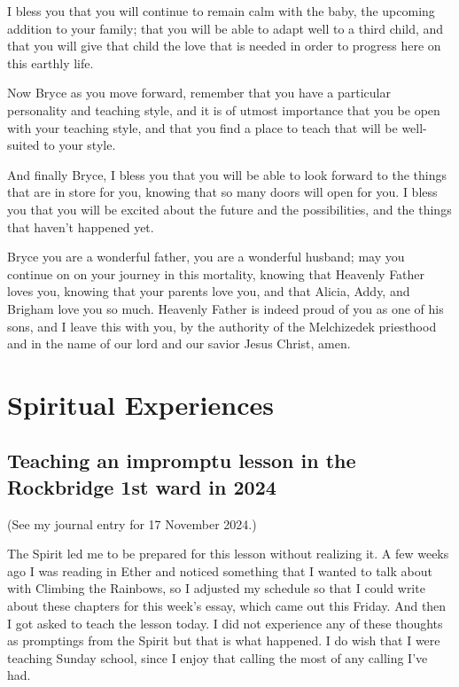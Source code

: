 			I bless you that you will continue to remain calm with the baby, the upcoming addition to your family; that you will be able to adapt well to a third child, and that you will give that child the love that is needed in order to progress here on this earthly life. 

			Now Bryce as you move forward, remember that you have a particular personality and teaching style, and it is of utmost importance that you be open with your teaching style, and that you find a place to teach that will be well-suited to your style. 

			And finally Bryce, I bless you that you will be able to look forward to the things that are in store for you, knowing that so many doors will open for you. I bless you that you will be excited about the future and the possibilities, and the things that haven't happened yet. 

			Bryce you are a wonderful father, you are a wonderful husband; may you continue on on your journey in this mortality, knowing that Heavenly Father loves you, knowing that your parents love you, and that Alicia, Addy, and Brigham love you so much. Heavenly Father is indeed proud of you as one of his sons, and I leave this with you, by the authority of the Melchizedek priesthood and in the name of our lord and our savior Jesus Christ, amen.

\section{Spiritual Experiences}
	\label{SE}
	
	\subsection{Teaching an impromptu lesson in the Rockbridge 1st ward in 2024}
		\label{SE-LESSON-CTR}
		
		(See my journal entry for 17 November 2024.)
		
		The Spirit led me to be prepared for this lesson without realizing it. A few weeks ago I was reading in Ether and noticed something that I wanted to talk about with Climbing the Rainbows, so I adjusted my schedule so that I could write about these chapters for this week's essay, which came out this Friday. And then I got asked to teach the lesson today. I did not experience any of these thoughts as promptings from the Spirit but that is what happened. I do wish that I were teaching Sunday school, since I enjoy that calling the most of any calling I've had.


